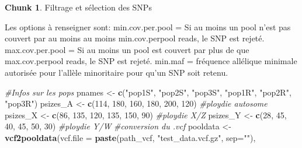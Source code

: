 \documentclass[
  openany]{book}
\newenvironment{Shaded}{\begin{snugshade}}{\end{snugshade}}
\newcommand{\AttributeTok}[1]{\textcolor[rgb]{0.13,0.29,0.53}{#1}}
\newcommand{\CommentTok}[1]{\textcolor[rgb]{0.56,0.35,0.01}{\textit{#1}}}
\newcommand{\FunctionTok}[1]{\textcolor[rgb]{0.13,0.29,0.53}{\textbf{#1}}}
\newcommand{\NormalTok}[1]{#1}
\newcommand{\OtherTok}[1]{\textcolor[rgb]{0.56,0.35,0.01}{#1}}
\newcommand{\StringTok}[1]{\textcolor[rgb]{0.31,0.60,0.02}{#1}}
\theoremstyle{definition}
\theoremstyle{definition}
\theoremstyle{definition}
\newtheorem{exercise}{Chunk}[chapter]
\theoremstyle{definition}
\theoremstyle{remark}
\begin{document}
\begin{exercise}
\protect\hypertarget{exr:chunk2}{}\label{exr:chunk2}{Filtrage et sélection des SNPs}
\end{exercise}

Les options à renseigner sont:
min.cov.per.pool = Si au moins un pool n'est pas couvert par au moins au moins min.cov.perpool reads, le SNP est rejeté.
max.cov.per.pool = Si au moins un pool est couvert par plus de que max.cov.perpool reads, le SNP est rejeté.
min.maf = fréquence allélique minimale autorisée pour l'allèle minoritaire pour qu'un SNP soit retenu.

\begin{Shaded}
\begin{Highlighting}[]
\CommentTok{\#Infos sur les pops}
\NormalTok{pnames }\OtherTok{\textless{}{-}} \FunctionTok{c}\NormalTok{(}\StringTok{"pop1S"}\NormalTok{, }\StringTok{"pop2S"}\NormalTok{, }\StringTok{"pop3S"}\NormalTok{, }\StringTok{"pop1R"}\NormalTok{, }\StringTok{"pop2R"}\NormalTok{, }\StringTok{"pop3R"}\NormalTok{)}
\NormalTok{psizes\_A }\OtherTok{\textless{}{-}} \FunctionTok{c}\NormalTok{(}\StringTok{\textquotesingle{}114\textquotesingle{}}\NormalTok{, }\StringTok{\textquotesingle{}180\textquotesingle{}}\NormalTok{, }\StringTok{\textquotesingle{}160\textquotesingle{}}\NormalTok{, }\StringTok{\textquotesingle{}180\textquotesingle{}}\NormalTok{, }\StringTok{\textquotesingle{}200\textquotesingle{}}\NormalTok{, }\StringTok{\textquotesingle{}120\textquotesingle{}}\NormalTok{)   }\CommentTok{\#ploydie autosome}
\NormalTok{psizes\_X }\OtherTok{\textless{}{-}} \FunctionTok{c}\NormalTok{(}\StringTok{\textquotesingle{}86\textquotesingle{}}\NormalTok{, }\StringTok{\textquotesingle{}135\textquotesingle{}}\NormalTok{, }\StringTok{\textquotesingle{}120\textquotesingle{}}\NormalTok{, }\StringTok{\textquotesingle{}135\textquotesingle{}}\NormalTok{, }\StringTok{\textquotesingle{}150\textquotesingle{}}\NormalTok{, }\StringTok{\textquotesingle{}90\textquotesingle{}}\NormalTok{)     }\CommentTok{\#ploydie X/Z}
\NormalTok{psizes\_Y }\OtherTok{\textless{}{-}} \FunctionTok{c}\NormalTok{(}\StringTok{\textquotesingle{}28\textquotesingle{}}\NormalTok{, }\StringTok{\textquotesingle{}45\textquotesingle{}}\NormalTok{, }\StringTok{\textquotesingle{}40\textquotesingle{}}\NormalTok{, }\StringTok{\textquotesingle{}45\textquotesingle{}}\NormalTok{, }\StringTok{\textquotesingle{}50\textquotesingle{}}\NormalTok{, }\StringTok{\textquotesingle{}30\textquotesingle{}}\NormalTok{)         }\CommentTok{\#ploydie Y/W}
\CommentTok{\#conversion du .vcf}
\NormalTok{pooldata }\OtherTok{\textless{}{-}} \FunctionTok{vcf2pooldata}\NormalTok{(}\AttributeTok{vcf.file =} \FunctionTok{paste}\NormalTok{(path\_vcf, }\StringTok{"test\_data.vcf.gz"}\NormalTok{, }\AttributeTok{sep=}\StringTok{""}\NormalTok{),}

\end{Highlighting}
\end{Shaded}
\end{document}
